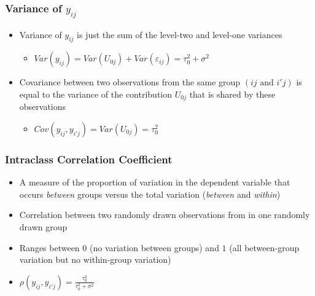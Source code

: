 \documentclass{beamer}
\begin{document}
\begin{frame}
	\frametitle{Variance of $y_{ij}$}
		\begin{itemize}
			\item Variance of  $y_{ij}$ is just the sum of the level-two and level-one variances
				\begin{itemize}
					\item $Var(y_{ij})=Var(U_{0j})+Var(\varepsilon_{ij})=\tau^{2}_{0}+\sigma^2$
				\end{itemize}
			\item Covariance between two observations from the same group $(ij\mbox{ and }i'j)$ is equal to the variance of the contribution $U_{0j}$ that is shared by these observations
				\begin{itemize}
					\item $Cov(y_{ij},y_{i'j})=Var(U_{0j})=\tau^{2}_{0}$
				\end{itemize}
		\end{itemize}
\end{frame}

\begin{frame}
	\frametitle{Intraclass Correlation Coefficient}
		\begin{itemize}
			\item A measure of the proportion of variation in the dependent variable that occurs \textit{between} groups versus the total variation (\textit{between} and \textit{within})
			\item Correlation between two randomly drawn observations from in one randomly drawn group
			\item Ranges between $0$ (no variation between groups) and $1$ (all between-group variation but no within-group variation)
			\item $\rho(y_{ij},y_{i'j})=\frac{\tau^{2}_{0}}{\tau^{2}_{0}+\sigma^2}$
		\end{itemize}
\end{frame}
\end{document}
